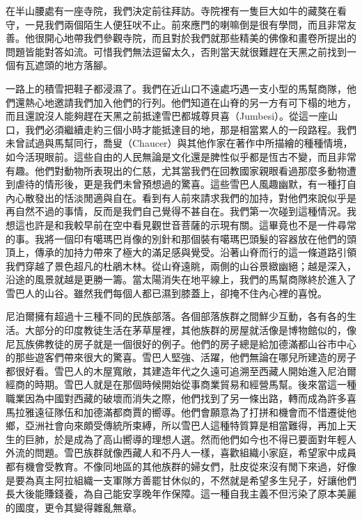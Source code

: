 在半山腰處有一座寺院，我們決定前往拜訪。寺院裡有一隻巨大如牛的藏獒在看守，一見我們兩個陌生人便狂吠不止。前來應門的喇嘛倒是很有學問，而且非常友善。他很開心地帶我們參觀寺院，而且對於我們就那些精美的佛像和畫卷所提出的問題皆能對答如流。可惜我們無法逗留太久，否則當天就很難趕在天黑之前找到一個有瓦遮頭的地方落腳。

一路上的積雪把鞋子都浸濕了。我們在近山口不遠處巧遇一支小型的馬幫商隊，他們還熱心地邀請我們加入他們的行列。他們知道在山脊的另一方有可下榻的地方，而且還說沒人能夠趕在天黑之前抵達雪巴都城尊貝喜（Jumbesi）。從這一座山口，我們必須繼續走約三個小時才能抵達目的地，那是相當累人的一段路程。我們未曾試過與馬幫同行，喬叟（Chaucer）與其他作家在著作中所描繪的種種情境，如今活現眼前。這些自由的人民無論是文化還是脾性似乎都是恆古不變，而且非常有趣。他們對動物所表現出的仁慈，尤其當我們在回教國家親眼看過那麼多動物遭到虐待的情形後，更是我們未曾預想過的驚喜。這些雪巴人風趣幽默，有一種打自內心散發出的恬淡閒適與自在。看到有人前來請求我們的加持，對他們來說似乎是再自然不過的事情，反而是我們自己覺得不甚自在。我們第一次碰到這種情況。我想這也許是和我較早前在空中看見觀世音菩薩的示現有關。這畢竟也不是一件尋常的事。我將一個印有噶瑪巴肖像的別針和那個裝有噶瑪巴頭髮的容器放在他們的頭頂上，傳承的加持力帶來了極大的滿足感與覺受。沿著山脊而行的這一條道路引領我們穿越了景色超凡的杜鵑木林。從山脊遠眺，兩側的山谷景緻幽絕；越是深入，沿途的風景就越是更勝一籌。當太陽消失在地平線上，我們的馬幫商隊終於進入了雪巴人的山谷。雖然我們每個人都已濕到膝蓋上，卻掩不住內心裡的喜悅。

尼泊爾擁有超過十三種不同的民族部落。各個部落族群之間鮮少互動，各有各的生活。大部分的印度教徒生活在茅草屋裡，其他族群的房屋就活像是博物館似的，像尼瓦族佛教徒的房子就是一個很好的例子。他們的房子總是給加德滿都山谷市中心的那些遊客們帶來很大的驚喜。雪巴人堅強、活躍，他們無論在哪兒所建造的房子都很好看。雪巴人的木屋寬敞，其建造年代之久遠可追溯至西藏人開始進入尼泊爾經商的時期。雪巴人就是在那個時候開始從事商業貿易和經營馬幫。後來當這一種職業因為中國對西藏的破壞而消失之際，他們找到了另一條出路，轉而成為許多喜馬拉雅遠征隊伍和加德滿都商賈的嚮導。他們會願意為了打拼和機會而不惜遷徙他鄉，亞洲社會向來頗受傳統所束縛，所以雪巴人這種特質算是相當難得，再加上天生的巨肺，於是成為了高山嚮導的理想人選。然而他們如今也不得已要面對年輕人外流的問題。雪巴族群就像西藏人和不丹人一樣，喜歡組織小家庭，希望家中成員都有機會受教育。不像同地區的其他族群的婦女們，肚皮從來沒有閒下來過，好像是要為真主阿拉組織一支軍隊方善罷甘休似的，不然就是希望多生兒子，好讓他們長大後能賺錢養，為自己能安享晚年作保障。這一種自我主義不但污染了原本美麗的國度，更令其變得雜亂無章。

